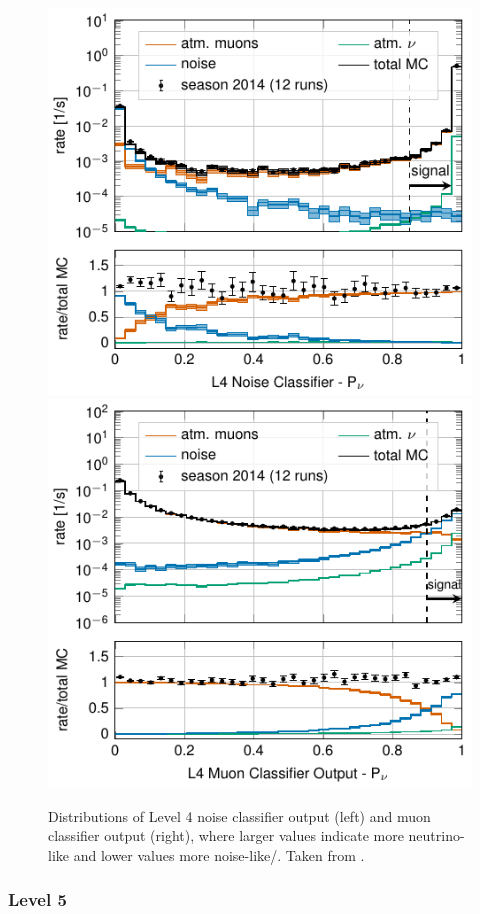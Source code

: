 \begin{figure}
\centering 
\includegraphics[width=0.49\linewidth]{figures/simulation_and_processing/selection/l4_noise_classifier_probnu.pdf}
\includegraphics[width=0.49\linewidth]{figures/simulation_and_processing/selection/l4_muon_classifier_probnu.pdf}

\caption[Level 4 classifier outputs (muon and noise)]{Distributions of Level 4 noise classifier output (left) and muon classifier output (right), where larger values indicate more neutrino-like and lower values more noise-like/. Taken from \cite{OVS_PRD}.}
\end{figure}


\subsubsection{Level 5} 

